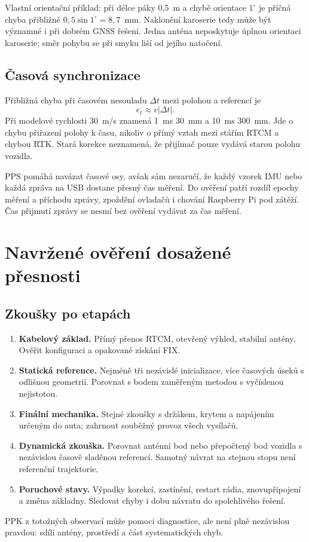 \documentclass[11pt,a4paper]{article}
\begin{document}
Vlastní orientační příklad: při délce páky 0,5~m a chybě orientace $1^\circ$ je příčná chyba přibližně $0{,}5\sin 1^\circ=8{,}7$~mm. Naklonění karoserie tedy může být významné i při dobrém GNSS řešení. Jedna anténa neposkytuje úplnou orientaci karoserie; směr pohybu se při smyku liší od jejího natočení.

\subsection{Časová synchronizace}
Přibližná chyba při časovém nesouladu $\Delta t$ mezi polohou a referencí je
\begin{equation}
 e_t \approx v|\Delta t|.
\end{equation}
Při modelové rychlosti 30~m/s znamená 1~ms 30~mm a 10~ms 300~mm. Jde o chybu přiřazení polohy k času, nikoliv o přímý vztah mezi stářím RTCM a chybou RTK. Stará korekce neznamená, že přijímač pouze vydává starou polohu vozidla.

PPS pomáhá navázat časové osy, avšak sám nezaručí, že každý vzorek IMU nebo každá zpráva na USB dostane přesný čas měření. Do ověření patří rozdíl epochy měření a příchodu zprávy, zpoždění ovladačů i chování Raspberry Pi pod zátěží. Čas přijmutí zprávy se nesmí bez ověření vydávat za čas měření.

\section{Navržené ověření dosažené přesnosti}
\subsection{Zkoušky po etapách}
\begin{enumerate}
\item \textbf{Kabelový základ.} Přímý přenos RTCM, otevřený výhled, stabilní antény. Ověřit konfiguraci a opakované získání FIX.
\item \textbf{Statická reference.} Nejméně tři nezávislé inicializace, více časových úseků s odlišnou geometrií. Porovnat s bodem zaměřeným metodou s vyčíslenou nejistotou.
\item \textbf{Finální mechanika.} Stejné zkoušky s držákem, krytem a napájením určeným do auta; zahrnout souběžný provoz všech vysílačů.
\item \textbf{Dynamická zkouška.} Porovnat anténní bod nebo přepočtený bod vozidla s nezávislou časově sladěnou referencí. Samotný návrat na stejnou stopu není referenční trajektorie.
\item \textbf{Poruchové stavy.} Výpadky korekcí, zastínění, restart rádia, znovupřipojení a změna základny. Sledovat chyby i dobu návratu do spolehlivého řešení.
\end{enumerate}
PPK z totožných observací může pomoci diagnostice, ale není plně nezávislou pravdou: sdílí antény, prostředí a část systematických chyb.
\end{document}
